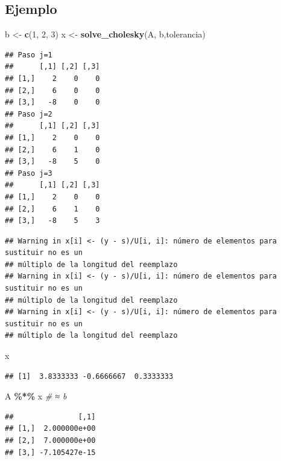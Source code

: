 \documentclass[
]{book}
\newenvironment{Shaded}{\begin{snugshade}}{\end{snugshade}}
\newcommand{\CommentTok}[1]{\textcolor[rgb]{0.56,0.35,0.01}{\textit{#1}}}
\newcommand{\DecValTok}[1]{\textcolor[rgb]{0.00,0.00,0.81}{#1}}
\newcommand{\FunctionTok}[1]{\textcolor[rgb]{0.13,0.29,0.53}{\textbf{#1}}}
\newcommand{\NormalTok}[1]{#1}
\newcommand{\OtherTok}[1]{\textcolor[rgb]{0.56,0.35,0.01}{#1}}
\newcommand{\SpecialCharTok}[1]{\textcolor[rgb]{0.81,0.36,0.00}{\textbf{#1}}}
\begin{document}
\subsection{Ejemplo}\label{ejemplo-8}

\begin{Shaded}
\begin{Highlighting}[]
\NormalTok{b }\OtherTok{\textless{}{-}} \FunctionTok{c}\NormalTok{(}\DecValTok{1}\NormalTok{, }\DecValTok{2}\NormalTok{, }\DecValTok{3}\NormalTok{)}
\NormalTok{x }\OtherTok{\textless{}{-}} \FunctionTok{solve\_cholesky}\NormalTok{(A, b,tolerancia)}
\end{Highlighting}
\end{Shaded}

\begin{verbatim}
## Paso j=1
##      [,1] [,2] [,3]
## [1,]    2    0    0
## [2,]    6    0    0
## [3,]   -8    0    0
## Paso j=2
##      [,1] [,2] [,3]
## [1,]    2    0    0
## [2,]    6    1    0
## [3,]   -8    5    0
## Paso j=3
##      [,1] [,2] [,3]
## [1,]    2    0    0
## [2,]    6    1    0
## [3,]   -8    5    3
\end{verbatim}

\begin{verbatim}
## Warning in x[i] <- (y - s)/U[i, i]: número de elementos para sustituir no es un
## múltiplo de la longitud del reemplazo
## Warning in x[i] <- (y - s)/U[i, i]: número de elementos para sustituir no es un
## múltiplo de la longitud del reemplazo
## Warning in x[i] <- (y - s)/U[i, i]: número de elementos para sustituir no es un
## múltiplo de la longitud del reemplazo
\end{verbatim}

\begin{Shaded}
\begin{Highlighting}[]
\NormalTok{x}
\end{Highlighting}
\end{Shaded}

\begin{verbatim}
## [1]  3.8333333 -0.6666667  0.3333333
\end{verbatim}

\begin{Shaded}
\begin{Highlighting}[]
\NormalTok{A }\SpecialCharTok{\%*\%}\NormalTok{ x   }\CommentTok{\# ≈ b}
\end{Highlighting}
\end{Shaded}

\begin{verbatim}
##               [,1]
## [1,]  2.000000e+00
## [2,]  7.000000e+00
## [3,] -7.105427e-15
\end{verbatim}
\end{document}
